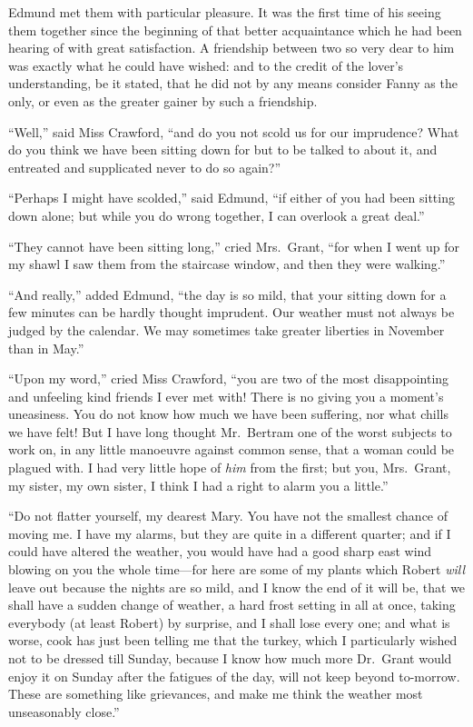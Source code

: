 \documentclass{article}
\begin{document}
Edmund met them with particular pleasure.  It was the
first time of his seeing them together since the beginning
of that better acquaintance which he had been hearing
of with great satisfaction.  A friendship between two so
very dear to him was exactly what he could have wished:
and to the credit of the lover's understanding, be it stated,
that he did not by any means consider Fanny as the only,
or even as the greater gainer by such a friendship.

``Well,'' said Miss Crawford, ``and do you not scold us for
our imprudence?  What do you think we have been sitting
down for but to be talked to about it, and entreated
and supplicated never to do so again?''

``Perhaps I might have scolded,'' said Edmund, ``if either
of you had been sitting down alone; but while you
do wrong together, I can overlook a great deal.''

``They cannot have been sitting long,'' cried Mrs.\ Grant,
``for when I went up for my shawl I saw them from the
staircase window, and then they were walking.''

``And really,'' added Edmund, ``the day is so mild,
that your sitting down for a few minutes can be hardly
thought imprudent.  Our weather must not always be judged
by the calendar.  We may sometimes take greater liberties
in November than in May.''

``Upon my word,'' cried Miss Crawford, ``you are two of the most
disappointing and unfeeling kind friends I ever met with!
There is no giving you a moment's uneasiness.  You do not
know how much we have been suffering, nor what chills
we have felt!  But I have long thought Mr.\ Bertram one
of the worst subjects to work on, in any little manoeuvre
against common sense, that a woman could be plagued with.
I had very little hope of \emph{him} from the first; but you,
Mrs.\ Grant, my sister, my own sister, I think I had a right
to alarm you a little.''

``Do not flatter yourself, my dearest Mary.  You have not
the smallest chance of moving me.  I have my alarms,
but they are quite in a different quarter; and if I could
have altered the weather, you would have had a good sharp
east wind blowing on you the whole time---for here are
some of my plants which Robert \emph{will} leave out because
the nights are so mild, and I know the end of it will be,
that we shall have a sudden change of weather, a hard frost
setting in all at once, taking everybody (at least Robert)
by surprise, and I shall lose every one; and what is worse,
cook has just been telling me that the turkey, which I
particularly wished not to be dressed till Sunday,
because I know how much more Dr.\ Grant would enjoy it
on Sunday after the fatigues of the day, will not keep
beyond to-morrow. These are something like grievances,
and make me think the weather most unseasonably close.''
\end{document}
